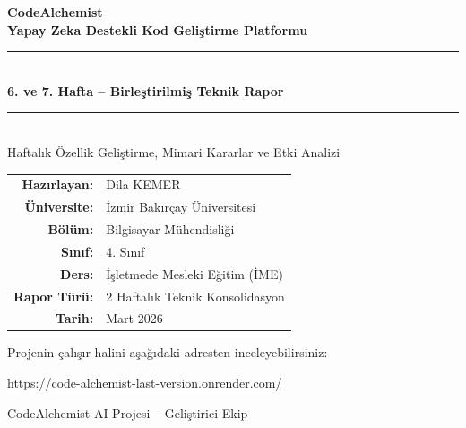 \documentclass[12pt,a4paper]{article}
\begin{document}
\sloppy

\begin{titlepage}
  \centering
  \vspace*{1.8cm}

  {\Huge\bfseries\color{keywordblue} CodeAlchemist}\\[0.8em]
  {\large\bfseries Yapay Zeka Destekli Kod Geliştirme Platformu}\\[2em]

  \rule{\textwidth}{1pt}\\[0.8em]
  {\LARGE\bfseries 6. ve 7. Hafta -- Birleştirilmiş Teknik Rapor}\\[0.5em]
  \rule{\textwidth}{1pt}\\[2em]

  {\large Haftalık Özellik Geliştirme, Mimari Kararlar ve Etki Analizi}

  \vspace{2.5em}

  \begin{tabular}{rl}
    \textbf{Hazırlayan:}   & Dila KEMER \\[0.4em]
    \textbf{Üniversite:}   & İzmir Bakırçay Üniversitesi \\[0.4em]
    \textbf{Bölüm:}        & Bilgisayar Mühendisliği \\[0.4em]
    \textbf{Sınıf:}        & 4. Sınıf \\[0.4em]
    \textbf{Ders:}         & İşletmede Mesleki Eğitim (İME) \\[0.4em]
    \textbf{Rapor Türü:}   & 2 Haftalık Teknik Konsolidasyon \\[0.4em]
    \textbf{Tarih:}        & Mart 2026 \\
  \end{tabular}

  \vspace{2.4em}

  \begin{ozetbox}
    Projenin çalışır halini aşağıdaki adresten inceleyebilirsiniz:\\[0.6em]
    \begin{center}
      \large\href{https://code-alchemist-last-version.onrender.com/}%
      {https://code-alchemist-last-version.onrender.com/}
    \end{center}
  \end{ozetbox}

  \vfill
  {\small\color{gray} CodeAlchemist AI Projesi -- Geliştirici Ekip}
\end{titlepage}
\end{document}
